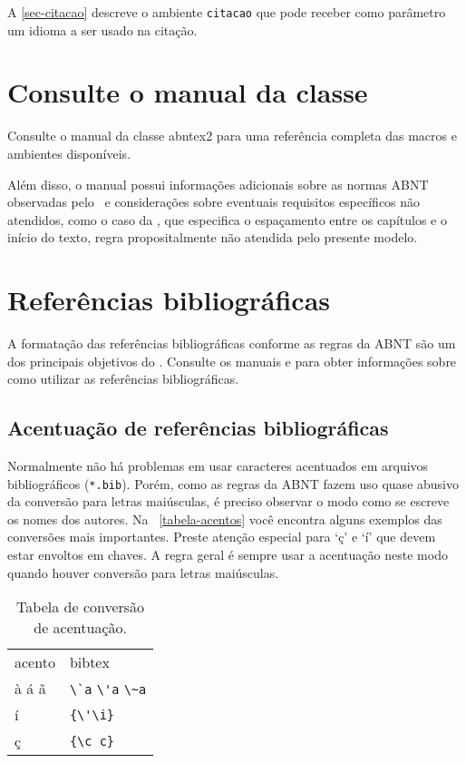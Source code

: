 \documentclass[article,12pt,oneside,a4paper,chapter=TITLE,
			   english,brazil]{abntex2}
\begin{document}
\begin{anexosenv}
A \autoref{sec-citacao} descreve o ambiente \texttt{citacao} que pode receber como parâmetro um idioma a ser usado na citação.


\section{Consulte o manual da classe \abnTeX}

Consulte o manual da classe \textsf{abntex2} \cite{abntex2classe} para uma referência completa das macros e ambientes disponíveis. 

Além disso, o manual possui informações adicionais sobre as normas ABNT observadas pelo \abnTeX\ e considerações sobre eventuais requisitos específicos não atendidos, como o caso da , que especifica o espaçamento entre os capítulos e o início do texto, regra propositalmente não atendida pelo presente modelo.


\section{Referências bibliográficas}

A formatação das referências bibliográficas conforme as regras da ABNT são um dos principais objetivos do \abnTeX. Consulte os manuais  e  para obter informações sobre como utilizar as referências bibliográficas.

\subsection{Acentuação de referências bibliográficas}

Normalmente não há problemas em usar caracteres acentuados em arquivos bibliográficos (\texttt{*.bib}). Porém, como as regras da ABNT fazem uso quase abusivo da conversão para letras maiúsculas, é preciso observar o modo como se escreve os nomes dos autores. Na ~\autoref{tabela-acentos} você encontra alguns exemplos das conversões mais importantes. Preste atenção especial para `ç' e `í' que devem estar envoltos em chaves. A regra geral é sempre usar a acentuação neste modo quando houver conversão para letras maiúsculas.
\begin{table}[htbp]
\caption{Tabela de conversão de acentuação.}
\label{tabela-acentos}
\begin{center}
\begin{tabular}{ll}\hline\hline
acento & \textsf{bibtex}\\
à á ã & \verb+\`a+ \verb+\'a+ \verb+\~a+\\
í & \verb+{\'\i}+\\
ç & \verb+{\c c}+\\
\hline\hline
\end{tabular}
\end{center}
\end{table}



\end{anexosenv}
\end{document}
